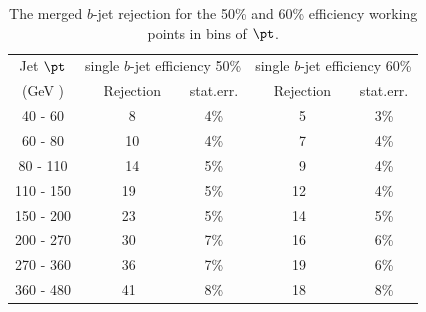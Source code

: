 \begin{table}[!hbt] %
\renewcommand{\arraystretch}{1.2}
\centering
\begin{tabular}{ | c || c | c || c | c||}
  \hline
  Jet $\pt$ & \multicolumn{2}{c||}{single $b$-jet efficiency 50\%} & 
            \multicolumn{2}{c||}{single $b$-jet efficiency 60\%}\\ \cline{2-5}
    (GeV )  & ~~Rejection~ & stat.err. & ~~Rejection~ & stat.err. \\ \hline
   40 - 60 &  ~8 &  4\%  &  ~5  &  3\%    \\ 
   60 - 80 &  ~10 &  4\%  &  ~7  &  4\%    \\ 
   80 - 110&  ~14 &  5\%  &  ~9  &  4\%    \\ 
  110 - 150&  19 &  5\%  &  12  &  4\%    \\ 
  150 - 200&  23 &  5\%  &  14  &  5\%    \\ 
  200 - 270&  30 &  7\%  &  16  &  6\%    \\ 
  270 - 360&  36 &  7\%  &  19  &  6\%    \\ 
  360 - 480&  41 &  8\%  &  18  &  8\%    \\ \hline
\end{tabular}
\caption{The merged $b$-jet rejection for the 50\% and 60\% efficiency working points in bins of $\pt$.}
\label{tb:rejection}
\end{table}





